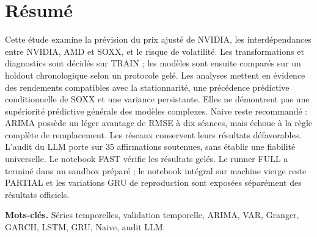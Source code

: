 \section*{Résumé}
Cette étude examine la prévision du prix ajusté de NVIDIA, les interdépendances entre NVIDIA, AMD et SOXX, et le risque de volatilité. Les transformations et diagnostics sont décidés sur TRAIN ; les modèles sont ensuite comparés sur un holdout chronologique selon un protocole gelé. Les analyses mettent en évidence des rendements compatibles avec la stationnarité, une précédence prédictive conditionnelle de SOXX et une variance persistante. Elles ne démontrent pas une supériorité prédictive générale des modèles complexes. Naive reste recommandé : ARIMA possède un léger avantage de RMSE à dix séances, mais échoue à la règle complète de remplacement. Les réseaux conservent leurs résultats défavorables. L’audit du LLM porte sur 35 affirmations soutenues, sans établir une fiabilité universelle. Le notebook FAST vérifie les résultats gelés. Le runner FULL a terminé dans un sandbox préparé ; le notebook intégral sur machine vierge reste PARTIAL et les variations GRU de reproduction sont exposées séparément des résultats officiels.



\textbf{Mots-clés.} Séries temporelles, validation temporelle, ARIMA, VAR, Granger, GARCH, LSTM, GRU, Naive, audit LLM.
